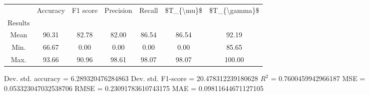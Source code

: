 \begin{tabular}{|c|c|c|c|c|c|c|}
\toprule
{} &  Accuracy &  F1 score &  Precision &  Recall &  \$T\_\{\textbackslash mu\}\$ &  \$T\_\{\textbackslash gamma\}\$ \\
Results &           &           &            &         &            &               \\
\hline
Mean    &     90.31 &     82.78 &      82.00 &   86.54 &      86.54 &         92.19 \\
Min.    &     66.67 &      0.00 &       0.00 &    0.00 &       0.00 &         85.65 \\
Max.    &     93.66 &     90.96 &      98.61 &   98.07 &      98.07 &        100.00 \\
\bottomrule
\end{tabular}

 Dev. std. accuracy = 6.289320476284863
 Dev. std. F1-score = 20.478312239180628
 $R^2$ = 0.7600459942966187
 MSE = 0.053323047032538706
 RMSE = 0.23091783610743175
 MAE = 0.09811644671127105